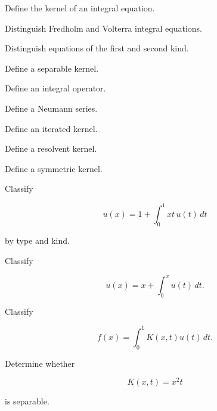 \begin{exercise}[1]
Define the kernel of an integral equation.
\end{exercise}

\begin{exercise}[1]
Distinguish Fredholm and Volterra integral equations.
\end{exercise}

\begin{exercise}[1]
Distinguish equations of the first and second kind.
\end{exercise}

\begin{exercise}[1]
Define a separable kernel.
\end{exercise}

\begin{exercise}[1]
Define an integral operator.
\end{exercise}

\begin{exercise}[1]
Define a Neumann series.
\end{exercise}

\begin{exercise}[1]
Define an iterated kernel.
\end{exercise}

\begin{exercise}[1]
Define a resolvent kernel.
\end{exercise}

\begin{exercise}[1]
Define a symmetric kernel.
\end{exercise}

\begin{exercise}[2]
Classify

\[
u(x)
=
1
+
\int_0^1
xt\,u(t)\,dt
\]

by type and kind.
\end{exercise}

\begin{exercise}[2]
Classify

\[
u(x)
=
x
+
\int_0^x
u(t)\,dt.
\]
\end{exercise}

\begin{exercise}[2]
Classify

\[
f(x)
=
\int_0^1
K(x,t)u(t)\,dt.
\]
\end{exercise}

\begin{exercise}[2]
Determine whether

\[
K(x,t)=x^2t
\]

is separable.
\end{exercise}

